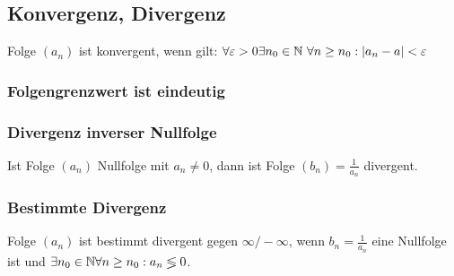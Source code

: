 \subsection*{Konvergenz, Divergenz}
Folge $(a_n)$ ist konvergent, wenn gilt:
$\forall \varepsilon > 0 \exists n_0 \in \mathbb N \ \forall n \geq n_0: |a_n -a | < \varepsilon$\\
\subsubsection*{Folgengrenzwert ist eindeutig}
\subsubsection*{Divergenz inverser Nullfolge}
Ist Folge $(a_n)$ Nullfolge mit $a_n \neq 0$, dann ist Folge $(b_n) = \frac{1}{a_n}$ divergent.
\subsubsection*{Bestimmte Divergenz}
Folge $(a_n)$ ist bestimmt divergent gegen $\infty/-\infty$, wenn $b_n = \frac{1}{a_n}$ eine Nullfolge ist und $\exists n_0 \in \mathbb N \forall n \geq n_0: a_n \lessgtr 0$. %
